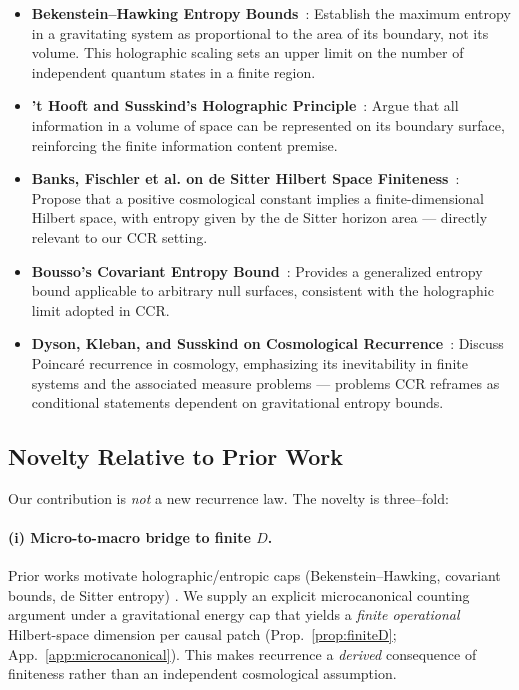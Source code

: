 \documentclass[12pt]{article}
\theoremstyle{remark}
\begin{document}
\begin{itemize}[leftmargin=1.2em]
    \item \textbf{Bekenstein--Hawking Entropy Bounds}~\cite{Bekenstein1973,Hawking1975}: 
    Establish the maximum entropy in a gravitating system as proportional to the area of its boundary, not its volume. This holographic scaling sets an upper limit on the number of independent quantum states in a finite region.

    \item \textbf{'t Hooft and Susskind's Holographic Principle}~\cite{tHooft1993,Susskind1995}:  
    Argue that all information in a volume of space can be represented on its boundary surface, reinforcing the finite information content premise.

    \item \textbf{Banks, Fischler et al. on de Sitter Hilbert Space Finiteness}~\cite{BanksFischler2001,BanksFischler2003}:  
    Propose that a positive cosmological constant implies a finite-dimensional Hilbert space, with entropy given by the de Sitter horizon area — directly relevant to our CCR setting.

    \item \textbf{Bousso’s Covariant Entropy Bound}~\cite{Bousso1999}:  
    Provides a generalized entropy bound applicable to arbitrary null surfaces, consistent with the holographic limit adopted in CCR.

    \item \textbf{Dyson, Kleban, and Susskind on Cosmological Recurrence}~\cite{DysonKlebanSusskind2002}:  
    Discuss Poincaré recurrence in cosmology, emphasizing its inevitability in finite systems and the associated measure problems — problems CCR reframes as conditional statements dependent on gravitational entropy bounds.
\end{itemize}


\subsection{Novelty Relative to Prior Work}
\label{subsec:novelty}
Our contribution is \emph{not} a new recurrence law. The novelty is three–fold:

\paragraph{(i) Micro-to-macro bridge to finite $D$.}
Prior works motivate holographic/entropic caps (Bekenstein–Hawking, covariant bounds, de Sitter entropy) \cite{Bekenstein1973,Hawking1975,Bousso1999}.
We supply an explicit microcanonical counting argument under a gravitational energy cap that yields a \emph{finite operational} Hilbert-space dimension per causal patch (Prop.~\ref{prop:finiteD}; App.~\ref{app:microcanonical}).
This makes recurrence a \emph{derived} consequence of finiteness rather than an independent cosmological assumption.
\end{document}
